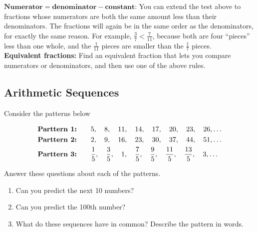 \noindent
$\textbf{Numerator} = \textbf{denominator} - \textbf{constant}$: You can extend the test above to fractions whose numerators are both the same amount less than their denominators. The fractions will again be in the same order as the denominators, for exactly the same reason.  For example, $\frac 3 7 < \frac 7{11}$, because both are  four ``pieces'' less than one whole, and the $\frac 1{11}$ pieces are smaller than the $\frac 17$ pieces.   \\

\noindent
{\bf Equivalent fractions:} Find an equivalent fraction that lets you compare numerators or denominators, and then use one of the above rules. 





\subsection{Arithmetic Sequences}
Consider the patterns below

\begin{align*}
\text{\bf Parttern 1:} &\qquad5, \quad 8, \quad 11, \quad 14, \quad 17, \quad 20, \quad 23, \quad 26, \ldots\\
\text{\bf Parttern 2:} &\qquad2, \quad 9, \quad 16, \quad 23, \quad 30, \quad 37, \quad 44, \quad 51, \ldots\\
\text{\bf Parttern 3:} &\qquad\frac 1 5, \quad \frac 3 5 , \quad 1, \quad \frac 7 5, \quad \frac 9 5, \quad \frac {11}5, \quad \frac {13}5, \quad 3, \ldots
\end{align*}

\begin{thinkpair*}
Answer these questions about each of the patterns.
\begin{enumerate}
\item
Can you predict the next 10 numbers?  \\

\item
Can you predict the 100th number?\\

\item
What do  these sequences have in common?  Describe the pattern in words.
\end{enumerate}


\end{thinkpair*}





